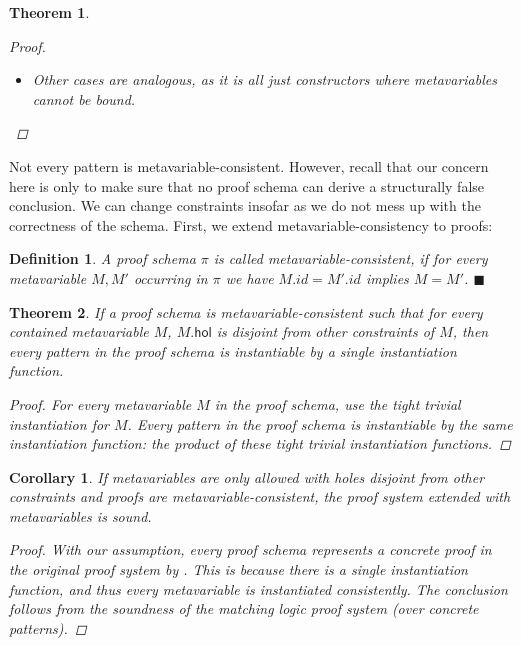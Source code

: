 \documentclass{article}
\newcommand{\xqed}[1]{%
    \leavevmode\unskip\penalty9999 \hbox{}\nobreak\hfill
    \quad\hbox{\ensuremath{#1}}}
\newcommand{\xqedhere}{\xqed{\blacksquare}}
\newtheorem{deff}{Definition}
\newenvironment{definition}[1]{%
  \begin{deff}#1}{%
  \xqedhere\end{deff}%
}
\numberwithin{deff}{section}
\numberwithin{lemma*}{section}
\newtheorem{corollary*}{Corollary}
\newtheorem{theorem*}{Theorem}
\newcommand{\Hol}{\mathsf{hol}}
\begin{document}
\begin{theorem*}
\begin{proof}
\begin{itemize}
      By , $M\delta$ is an instantiation of $M$ and also $\varphi \delta$ is an instantiation of $\varphi$: $\varphi$ is instantiable by $\delta$ iff every $M'$ in $\varphi$ is instantiable by $\delta$ (), which it is by IH and  (pick $M_1 := M$ and $M_2 := M'$).
      Thus the expression \[M\delta[\varphi\delta/\chi] = (M[\varphi/\chi])\delta\] is an instantiation of $M[\varphi/\chi]$.
      \item Other cases are analogous, as it is all just constructors where metavariables cannot be bound.
    \end{itemize}
  \end{proof}
\end{theorem*}

Not every pattern is metavariable-consistent.
However, recall that our concern here is only to make sure that no proof schema can derive a structurally false conclusion.
We can change constraints insofar as we do not mess up with the correctness of the schema.
First, we extend metavariable-consistency to proofs:

\begin{definition}
  A proof schema $\pi$ is called \emph{metavariable-consistent}, if for every metavariable $M, M'$ occurring in $\pi$ we have $M.id = M'.id$ implies $M = M'$.
\end{definition}

\begin{theorem*}
  \label{theorem:main}
  If a proof schema is metavariable-consistent such that for every contained metavariable $M$, $M.\Hol$ is disjoint from other constraints of $M$, then every pattern in the proof schema is instantiable by a single instantiation function.
  \begin{proof}
    For every metavariable $M$ in the proof schema, use the tight trivial instantiation for $M$.
    Every pattern in the proof schema is instantiable by the same instantiation function: the product of these tight trivial instantiation functions.
  \end{proof}
\end{theorem*}
\begin{corollary*}
  If metavariables are only allowed with holes disjoint from other constraints and proofs are metavariable-consistent, the proof system extended with metavariables is sound.
  \begin{proof}
  With our assumption, every proof schema represents a concrete proof in the original proof system by .
  This is because there is a single instantiation function, and thus every metavariable is instantiated consistently.
  The conclusion follows from the soundness of the matching logic proof system  (over concrete patterns).
  \end{proof}
\end{corollary*}
\end{document}
